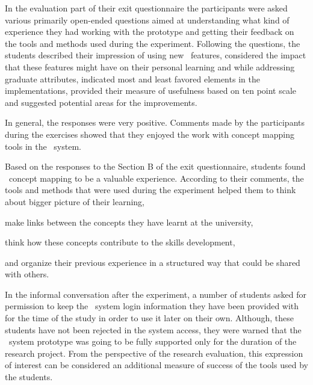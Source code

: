 In the evaluation part of their exit questionnaire the participants were asked
various primarily open-ended questions aimed at understanding what kind of
experience they had working with the prototype and getting their feedback on the
tools and methods used during the experiment. Following the questions, the
students described their impression of using new \ep~features, considered the
impact that these features might have on their personal learning and while
addressing graduate attributes, indicated most and least favored elements in the
implementations, provided their measure of usefulness based on ten point scale
and suggested potential areas for the improvements.

In general, the responses were very positive. Comments made by the participants
during the exercises showed that they enjoyed the work with concept mapping
tools in the \ep~system. 

Based on the responses to the Section B of the exit questionnaire, students
found \ep~concept mapping to be a valuable experience. According to their
comments, the tools and methods that were used during the experiment helped
them to think about bigger picture of their learning, 


make links between the concepts they have learnt at the university, 

think how these concepts contribute to the skills development, 

and organize their previous experience in a structured way that could be shared
with others.

In the informal conversation after the experiment, a number of students asked
for permission to keep the \ep~system login information they have been provided
with for the time of the study in order to use it later on their own. Although,
these students have not been rejected in the system access, they were warned
that the \ep~system prototype was going to be fully supported only for the
duration of the research project. From the perspective of the research
evaluation, this expression of interest can be considered an additional measure
of success of the tools used by the students.

